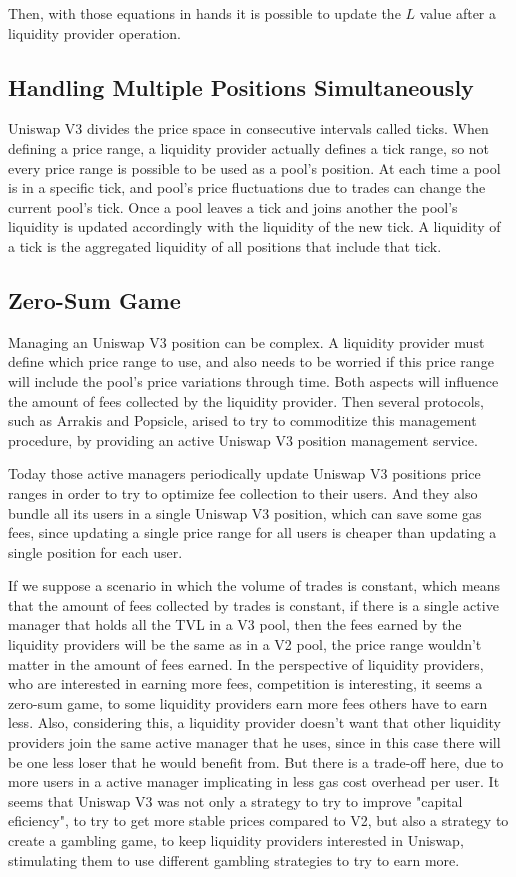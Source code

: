 \documentclass{article}
\begin{document}
Then, with those equations in hands it is possible to update the $L$ value after a liquidity provider operation.

\subsection{Handling Multiple Positions Simultaneously}

Uniswap V3 divides the price space in consecutive intervals called ticks.
When defining a price range, a liquidity provider actually defines a tick range, so not every price range is possible to be used as a pool's position.
At each time a pool is in a specific tick, and pool's price fluctuations due to trades can change the current pool's tick.
Once a pool leaves a tick and joins another the pool's liquidity is updated accordingly with the liquidity of the new tick.
A liquidity of a tick is the aggregated liquidity of all positions that include that tick.

\subsection{Zero-Sum Game}

Managing an Uniswap V3 position can be complex.
A liquidity provider must define which price range to use, and also needs to be worried if this price range will include the pool's price variations through time.
Both aspects will influence the amount of fees collected by the liquidity provider.
Then several protocols, such as Arrakis and Popsicle, arised to try to commoditize this management procedure, by providing an active Uniswap V3 position management service.

Today those active managers periodically update Uniswap V3 positions price ranges in order to try to optimize fee collection to their users.
And they also bundle all its users in a single Uniswap V3 position, which can save some gas fees, since updating a single price range for all users is cheaper than updating a single position for each user.

If we suppose a scenario in which the volume of trades is constant, which means that the amount of fees collected by trades is constant, if there is a single active manager that holds all the TVL in a V3 pool, then the fees earned by the liquidity providers will be the same as in a V2 pool, the price range wouldn't matter in the amount of fees earned.
In the perspective of liquidity providers, who are interested in earning more fees, competition is interesting, it seems a zero-sum game, to some liquidity providers earn more fees others have to earn less.
Also, considering this, a liquidity provider doesn't want that other liquidity providers join the same active manager that he uses, since in this case there will be one less loser that he would benefit from.
But there is a trade-off here, due to more users in a active manager implicating in less gas cost overhead per user.
It seems that Uniswap V3 was not only a strategy to try to improve "capital eficiency", to try to get more stable prices compared to V2, but also a strategy to create a gambling game, to keep liquidity providers interested in Uniswap, stimulating them to use different gambling strategies to try to earn more.
\end{document}
